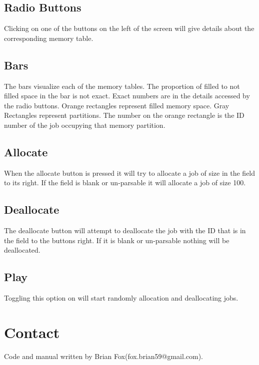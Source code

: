 \documentclass[10pt]{article}
\begin{document}
\subsection{Radio Buttons}
Clicking on one of the buttons on the left of the screen will give details about the corresponding memory table.
\subsection{Bars}
The bars visualize each of the memory tables. The proportion of filled to not filled space in the bar is not exact. Exact numbers are in the details accessed by the radio buttons. Orange rectangles represent filled memory space. Gray Rectangles represent partitions. The number on the orange rectangle is the ID number of the job occupying that memory partition.
\subsection{Allocate}
When the allocate button is pressed it will try to allocate a job of size in the field to its right. If the field is blank or un-parsable it will allocate a job of size 100.
\subsection{Deallocate}
The deallocate button will attempt to deallocate the job with the ID that is in the field to the buttons right. If it is blank or un-parsable nothing will be deallocated.
\subsection{Play}
Toggling this option on will start randomly allocation and deallocating jobs.
\section{Contact}
Code and manual written by Brian Fox(fox.brian59@gmail.com).
\end{document}
